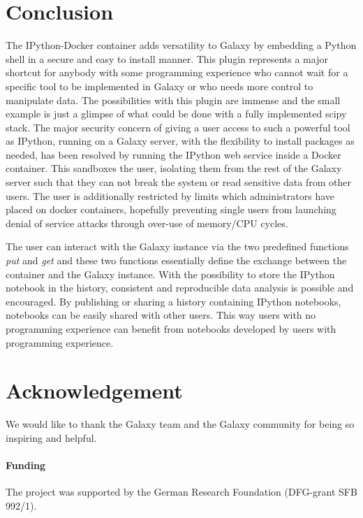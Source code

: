 \documentclass{bioinfo}
\begin{document}
\section{Conclusion}
The IPython-Docker container adds versatility to Galaxy by embedding a Python shell in a secure and easy to install manner.
This plugin represents a major shortcut for anybody with some programming experience who cannot wait for a specific tool to
be implemented in Galaxy or who needs more control to manipulate data. The possibilities with this plugin are immense and the
small example is just a glimpse of what could be done with a fully implemented scipy stack. The major security concern
of giving a user access to such a powerful tool as IPython, running on a Galaxy server, with the flexibility to install
packages as needed, has been resolved by running the IPython web service inside a Docker container. This sandboxes the user,
isolating them from the rest of the Galaxy server such that they can not break the system or read sensitive data from other
users. The user is additionally restricted by limits which administrators have placed on docker containers,
hopefully preventing single users from launching denial of service attacks through over-use of memory/CPU cycles.

The user can interact with the Galaxy instance via the two predefined functions \textit{put} and \textit{get} and these two
functions essentially define the exchange between the container and the Galaxy instance. With the possibility to store the
IPython notebook in the history, consistent and reproducible data analysis is possible and encouraged. 
By publishing or sharing a history containing IPython notebooks, notebooks can be easily shared with other users.
This way users with no programming experience can benefit from notebooks developed by users with programming experience.



\section*{Acknowledgement}
We would like to thank the Galaxy team and the Galaxy community for being so inspiring and helpful.


\paragraph{Funding\textcolon} The project was supported by the German Research Foundation (DFG-grant SFB 992/1).
\end{document}
